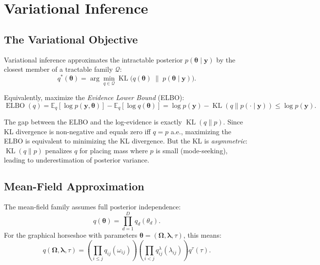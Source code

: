 \documentclass[11pt,a4paper]{article}
\newcommand{\E}{\mathbb{E}}
\newcommand{\KL}{\operatorname{KL}}
\newcommand{\ELBO}{\operatorname{ELBO}}
\newcommand{\bOmega}{\bm{\Omega}}
\newcommand{\blambda}{\bm{\lambda}}
\begin{document}
\section{Variational Inference}\label{sec:vi}

\subsection{The Variational Objective}

Variational inference approximates the intractable posterior $p(\bm{\theta}\mid\bm{y})$ by the closest member of a tractable family $\mathcal{Q}$:
\begin{equation}
  q^*(\bm{\theta}) = \arg\min_{q \in \mathcal{Q}} \KL\big(q(\bm{\theta})\;\|\;p(\bm{\theta}\mid\bm{y})\big).
\end{equation}

Equivalently, maximize the \emph{Evidence Lower Bound} (ELBO):
\begin{equation}\label{eq:elbo}
  \ELBO(q) = \E_q[\log p(\bm{y},\bm{\theta})] - \E_q[\log q(\bm{\theta})] = \log p(\bm{y}) - \KL(q\|p(\cdot\mid\bm{y})) \leq \log p(\bm{y}).
\end{equation}

\begin{keyinsight}
The gap between the ELBO and the log-evidence is exactly $\KL(q\|p)$. Since KL divergence is non-negative and equals zero iff $q = p$ a.e., maximizing the ELBO is equivalent to minimizing the KL divergence. But the KL is \emph{asymmetric}: $\KL(q\|p)$ penalizes $q$ for placing mass where $p$ is small (mode-seeking), leading to underestimation of posterior variance.
\end{keyinsight}

\subsection{Mean-Field Approximation}

The mean-field family assumes full posterior independence:
\begin{equation}
  q(\bm{\theta}) = \prod_{d=1}^{D} q_d(\theta_d).
\end{equation}
For the graphical horseshoe with parameters $\bm{\theta} = (\bOmega, \blambda, \tau)$, this means:
\begin{equation}
  q(\bOmega, \blambda, \tau) = \left(\prod_{i \leq j} q_{ij}(\omega_{ij})\right)\left(\prod_{i<j}q_{ij}^{\lambda}(\lambda_{ij})\right)q^{\tau}(\tau).
\end{equation}
\end{document}
